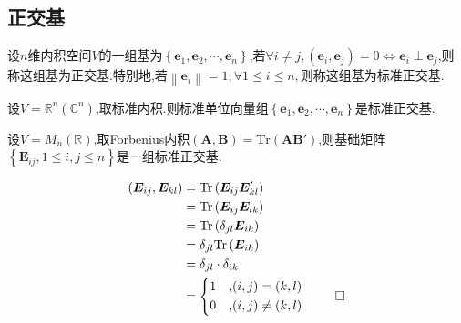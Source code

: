 \subsection{正交基}
\begin{formal}
    \begin{definition}[正交基的定义]\label{def:正交基的定义}
        设$n$维内积空间$V$的一组基为$\left\{\bm{e}_1,\bm{e}_2,\cdots,\bm{e}_n\right\}$,若$\forall i\neq j,\left(\bm{e}_i,\bm{e}_j\right)=0\Longleftrightarrow\bm{e}_i\perp\bm{e}_j$,则称这组基为正交基.特别地,若$\left\lVert\bm{e}_i\right\rVert=1,\forall 1\leqslant i\leqslant n,$则称这组基为标准正交基.
    \end{definition}
\end{formal}
\begin{brown}
    \begin{example}
        设$V=\mathbb{R}^n\left(\mathbb{C}^n\right)$,取标准内积.则标准单位向量组$\left\{
            \bm{e}_1,\bm{e}_2,\cdots,\bm{e}_n
        \right\}$是标准正交基.
    \end{example}
\end{brown}
\begin{brown}
    \begin{example}
        设$V=M_n\left(\mathbb{R}\right)$,取\textup{Forbenius}内积$\left(\bm{A},\bm{B}\right)=\mathrm{Tr}\left(\bm{A}\bm{B}'\right)$,则基础矩阵$\left\{
            \bm{E}_{ij},1\leqslant i,j\leqslant n
        \right\}$是一组标准正交基.
    \end{example}
    \begin{Proof}
        \begin{align*}
            \left(
                \bm{E}_{ij},\bm{E}_{kl}
            \right)&=\mathrm{Tr}\left(
                \bm{E}_{ij}\bm{E}_{kl}'
            \right)\\
            &=\mathrm{Tr}\left(
                \bm{E}_{ij}\bm{E}_{lk}
            \right)\\
            &=\mathrm{Tr}\left(
                \delta_{jl}\bm{E}_{ik}
            \right)\\
            &=\delta_{jl}\mathrm{Tr}\left(
                \bm{E}_{ik}
            \right)\\
            &=\delta_{jl}\cdot\delta_{ik}\\
            &=\begin{cases*}
                1&,$\left(i,j\right)=\left(k,l\right)$\\
                0&,$\left(i,j\right)\neq\left(k,l\right)$
            \end{cases*}\qedhere
        \end{align*}
    \end{Proof}
\end{brown}
